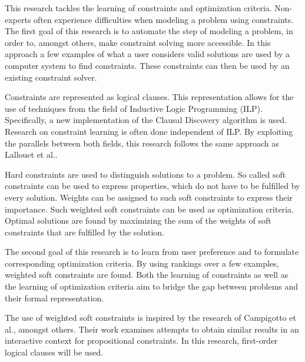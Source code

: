 \documentclass{llncs}
\begin{document}

This research tackles the learning of constraints and optimization criteria.
Non-experts often experience difficulties when modeling a problem using constraints\cite{Wallace:PrinciplesCP}.
The first goal of this research is to automate the step of modeling a problem, in order to, amongst others, make constraint solving more accessible.
In this approach a few examples of what a user considers valid solutions are used by a computer system to find constraints.
These constraints can then be used by an existing constraint solver.

Constraints are represented as logical clauses.
This representation allows for the use of techniques from the field of Inductive Logic Programming (ILP).
Specifically, a new implementation of the Clausal Discovery algorithm\cite{DeRaedt:ClausalDiscovery} is used.
Research on constraint learning is often done independent of ILP.
By exploiting the parallels between both fields, this research follows the same approach as Lallouet et al.\cite{Lallouet:LearningCP}.

Hard constraints are used to distinguish solutions to a problem.
So called soft constraints can be used to express properties, which do not have to be fulfilled by every solution.
Weights can be assigned to such soft constraints to express their importance.
Such weighted soft constraints can be used as optimization criteria.
Optimal solutions are found by maximizing the sum of the weights of soft constraints that are fulfilled by the solution.

The second goal of this research is to learn from user preference and to formulate corresponding optimization criteria.
By using rankings over a few examples, weighted soft constraints are found.
Both the learning of constraints as well as the learning of optimization criteria aim to bridge the gap between problems and their formal representation.

The use of weighted soft constraints is inspired by the research of Campigotto et al.\cite{campigotto2011active}, amongst others.
Their work examines attempts to obtain similar results in an interactive context for propositional constraints.
In this research, first-order logical clauses will be used.
\end{document}
